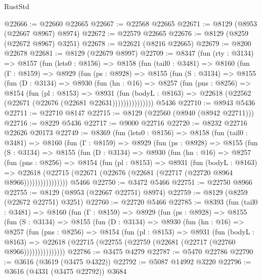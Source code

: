 \begin{lexlean}{RustStd}
\begin{coremodule}
@22666 := @22660 @22665
@22667 := @22568 @22665
@22671 := @8129 (@8953 (@22667 @8967) @8974)
@22672 := @22579 @22665
@22676 := @8129 (@8259 (@22672 @8967) @3251)
@22678 := @22621 (@8216 @22665)
@22679 := @8200 @22678
@22681 := @8129 (@22679 @8997)
@22709 := @8347
    (fun (rty : @3134) =>
    @8157
      (fun (lets0 : @8156) =>
      @8158
        (fun (tail0 : @3481) =>
        @8160
          (fun (Γ : @8159) =>
          @8929
            (fun (ps : @8928) =>
            @8155
              (fun (S : @3134) =>
              @8155
                (fun (D : @3134) =>
                @8930
                  (fun (hn : @16) =>
                  @8257
                    (fun (pns : @8256) =>
                    @8154
                      (fun (pl : @8153) =>
                      @8931
                        (fun (bodyL : @8163) =>
                        @22618 (@22562 (@22671 (@22676 (@22681 @22631)))))))))))))))
    @5436
@22710 := @8943 @5436
@22711 := @22710 @8147
@22715 := @8129 (@22560 (@8940 (@8942 @22711)))
@22716 := @8229 @5436
@22717 := @9000 @22716
@22720 := @8232 @22716 @22626 @20173
@22749 := @8369
    (fun (lets0 : @8156) =>
    @8158
      (fun (tail0 : @3481) =>
      @8160
        (fun (Γ : @8159) =>
        @8929
          (fun (ps : @8928) =>
          @8155
            (fun (S : @3134) =>
            @8155
              (fun (D : @3134) =>
              @8930
                (fun (hn : @16) =>
                @8257
                  (fun (pns : @8256) =>
                  @8154
                    (fun (pl : @8153) =>
                    @8931
                      (fun (bodyL : @8163) =>
                      @22618
                        (@22715 (@22671 (@22676 (@22681 (@22717 (@22720 @8964 @8966))))))))))))))))
    @5466
@22750 := @3472 @5466
@22751 := @22750 @8966
@22755 := @8129 (@8953 (@22667 @22751) @8974)
@22759 := @8129 (@8259 (@22672 @22751) @3251)
@22760 := @22720 @5466
@22785 := @8393
    (fun (tail0 : @3481) =>
    @8160
      (fun (Γ : @8159) =>
      @8929
        (fun (ps : @8928) =>
        @8155
          (fun (S : @3134) =>
          @8155
            (fun (D : @3134) =>
            @8930
              (fun (hn : @16) =>
              @8257
                (fun (pns : @8256) =>
                @8154
                  (fun (pl : @8153) =>
                  @8931
                    (fun (bodyL : @8163) =>
                    @22618 (@22715 (@22755 (@22759 (@22681 (@22717 (@22760 @8966)))))))))))))))
@22786 := @3475 @4279
@22787 := @5470 @22786
@22790 := @3616 (@3619 (@3475 @4322))
@22792 := @5087 @14992 @3220
@22796 := @3616 (@4331 (@3475 @22792)) @3684

\end{coremodule}
\end{lexlean}
